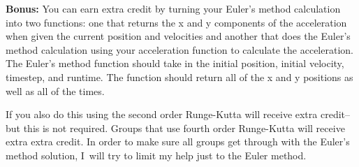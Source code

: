\documentclass[twoside,11pt,ShortChapTitles]{BYUTextbook}
\begin{document}
{\small {\bf Bonus:}  You can earn extra credit by turning your Euler's method calculation into two functions: one that returns the x and y components of the acceleration when given the current position and velocities and another that does the Euler's method calculation using your acceleration function to calculate the acceleration.  The Euler's method function should take in the initial position, initial velocity, timestep, and runtime.  The function should return all of the x and y positions as well as all of the times.

If you also do this using the second order Runge-Kutta will receive
extra credit--but this is not required. Groups that use fourth order
Runge-Kutta will receive extra extra credit. In order to make sure all groups
get through with the Euler's method solution, I\ will try to limit my help
just to the Euler method. }
\end{document}
